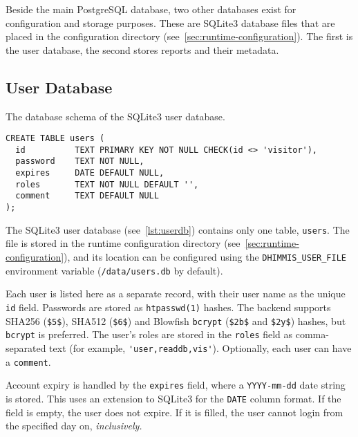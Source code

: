 Beside the main PostgreSQL database, two other databases exist for configuration and storage purposes.
These are SQLite3 database files that are placed in the configuration directory (see~\cref{sec:runtime-configuration}).
The first is the user database, the second stores reports and their metadata.


\subsection{User Database}
\label{sec:user-database}

\begin{lstfloat}
  \centering
  \caption{The database schema of the SQLite3 user database.}
  \label{lst:userdb}

  \begin{lstlisting}
CREATE TABLE users (
  id          TEXT PRIMARY KEY NOT NULL CHECK(id <> 'visitor'),
  password    TEXT NOT NULL,
  expires     DATE DEFAULT NULL,
  roles       TEXT NOT NULL DEFAULT '',
  comment     TEXT DEFAULT NULL
);
  \end{lstlisting}
\end{lstfloat}

The SQLite3 user database (see~\cref{lst:userdb}) contains only one table, \verb!users!.
The file is stored in the runtime configuration directory (see~\cref{sec:runtime-configuration}), and its location can be configured using the \verb!DHIMMIS_USER_FILE! environment variable (\verb!/data/users.db! by default).

Each user is listed here as a separate record, with their user name as the unique \verb!id! field.
Passwords are stored as \verb!htpasswd(1)! hashes.
The backend supports SHA256 (\verb!$5$!), SHA512 (\verb!$6$!) and Blowfish \verb!bcrypt! (\verb!$2b$! and \verb!$2y$!) hashes, but \verb!bcrypt! is preferred.
The user's roles are stored in the \verb!roles! field as comma-separated text (for example, \verb!'user,readdb,vis'!).
Optionally, each user can have a \verb!comment!.

Account expiry is handled by the \verb!expires! field, where a \verb!YYYY-mm-dd! date string is stored.
This uses an extension to SQLite3 for the \verb!DATE! column format.
If the field is empty, the user does not expire.
If it is filled, the user cannot login from the specified day on, \emph{inclusively.}


